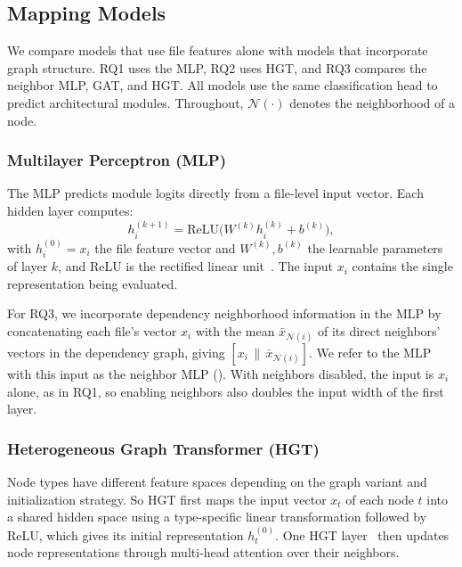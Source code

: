 \subsection{Mapping Models\label{sec:mapping_models}}
We compare models that use file features alone with models that incorporate graph structure. RQ1 uses the MLP, RQ2 uses HGT, and RQ3 compares the neighbor MLP, GAT, and HGT. All models use the same classification head to predict architectural modules. Throughout, $\mathcal{N}(\cdot)$ denotes the neighborhood of a node.

\subsubsection{Multilayer Perceptron (MLP)\label{sec:mlp}}
The MLP predicts module logits directly from a file-level input vector. Each hidden layer computes:
\begin{equation}
h_i^{(k+1)} = \text{ReLU}\big(W^{(k)} h_i^{(k)} + b^{(k)}\big),
\end{equation}
with $h_i^{(0)} = x_i$ the file feature vector and $W^{(k)}, b^{(k)}$ the learnable parameters of layer $k$, and ReLU is the rectified linear unit~\cite{relu}. The input $x_i$ contains the single representation being evaluated.
 
For RQ3, we incorporate dependency neighborhood information in the MLP by concatenating each file's vector $x_i$ with the mean $\bar{x}_{\mathcal{N}(i)}$ of its direct neighbors' vectors in the dependency graph, giving $[x_i \,\|\, \bar{x}_{\mathcal{N}(i)}]$. We refer to the MLP with this input as the neighbor MLP (\mlp{}). With neighbors disabled, the input is $x_i$ alone, as in RQ1, so enabling neighbors also doubles the input width of the first layer.
 
\subsubsection{Heterogeneous Graph Transformer (HGT)\label{sec:hgt_model}}
Node types have different feature spaces depending on the graph variant and initialization strategy. So HGT first maps the input vector $x_t$ of each node $t$ into a shared hidden space using a type-specific linear transformation followed by ReLU, which gives its initial representation $h_t^{(0)}$. One HGT layer~\cite{hgt} then updates node representations through multi-head attention over their neighbors.
 
